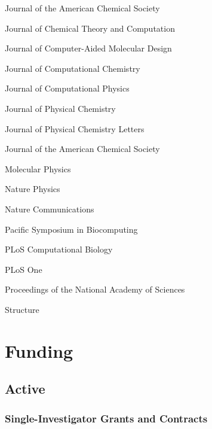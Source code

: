 \documentclass[10pt]{article}
\begin{document}
Journal of the American Chemical Society

Journal of Chemical Theory and Computation

Journal of Computer-Aided Molecular Design

Journal of Computational Chemistry

Journal of Computational Physics

Journal of Physical Chemistry

Journal of Physical Chemistry Letters

Journal of the American Chemical Society

Molecular Physics

Nature Physics

Nature Communications

Pacific Symposium in Biocomputing

PLoS Computational Biology

PLoS One

Proceedings of the National Academy of Sciences

Structure

\vfill{}
\hrulefill


\eject


\section*{Funding}

\subsection*{Active}

\subsubsection*{Single-Investigator Grants and Contracts}
\end{document}
